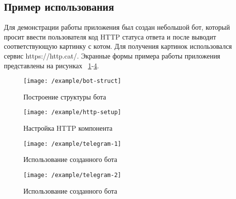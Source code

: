 

\subsection{Пример использования}


Для демонстрации работы приложения был создан небольшой бот, который
просит ввести пользователя код HTTP статуса ответа и после выводит соответствующую картинку
с котом. Для получения картинок использовался сервис https://http.cat/.
Экранные формы примера работы приложения представлены на рисунках~
\ref{f:example:bot-struct}-\ref{f:example:telegram-2}.

\begin{figure}[H]
	\centering
	\vspace{\toppaddingoffigure}
	\texttt{[image: /example/bot-struct]}
	\caption{Построение структуры бота}
	\label{f:example:bot-struct}
\end{figure}


\begin{figure}[H]
	\centering
	\texttt{[image: /example/http-setup]}
	\caption{Настройка HTTP компонента}
	\label{f:example:http-setup}
\end{figure}

\begin{figure}[H]
	\centering
	\texttt{[image: /example/telegram-1]}
	\caption{Использование созданного бота}
	\label{f:example:telegram-1}
\end{figure}


\begin{figure}[H]
	\centering
	\texttt{[image: /example/telegram-2]}
	\caption{Использование созданного бота}
	\label{f:example:telegram-2}
\end{figure}
